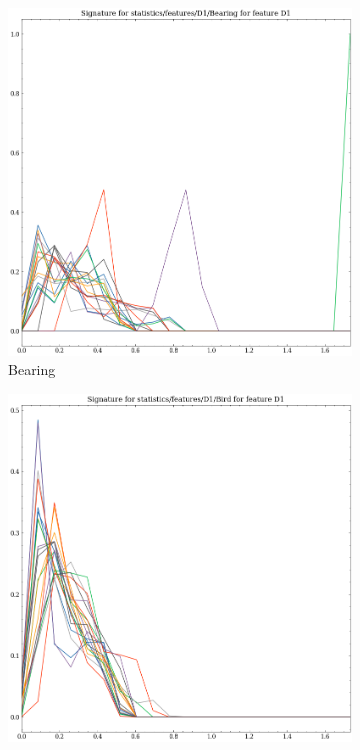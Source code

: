 \begin{figure}[t!p]
    \begin{subfigure}[b]{0.23\textwidth}
        \includegraphics[width=\textwidth]{assets/feature_extraction/D1/Bearing.png}
        \caption{Bearing}
        \label{fig:features-statistics-D1-e}    
    \end{subfigure}
    \hfill
    \begin{subfigure}[b]{0.23\textwidth}
        \includegraphics[width=\textwidth]{assets/feature_extraction/D1/Bird.png}

\end{subfigure}
\end{figure}
